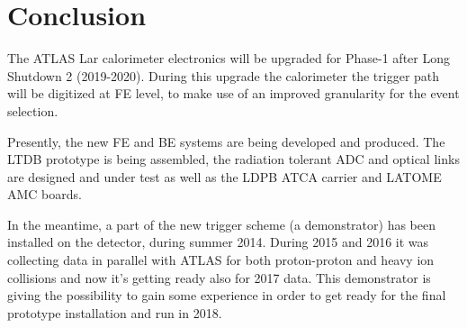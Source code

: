 \documentclass{llncs}
\begin{document}
\section{Conclusion}
The ATLAS Lar calorimeter electronics will be upgraded for Phase-1 after Long Shutdown 2 (2019-2020). During this upgrade the calorimeter the trigger path will be digitized at FE level, to make use of an improved granularity for the event selection.

Presently, the new FE and BE systems are being developed and produced. The LTDB prototype is being assembled, the radiation tolerant ADC and optical links are designed and under test as well as the LDPB ATCA carrier and LATOME AMC boards. 

In the meantime, a part of the new trigger scheme (a demonstrator) has been installed on the detector, during summer 2014. During 2015 and 2016 it was collecting data in parallel with ATLAS for both proton-proton and heavy ion collisions and now it's getting ready also for 2017 data. This demonstrator is giving the possibility to gain some experience in order to get ready for the final prototype installation and run in 2018.



\end{document}
